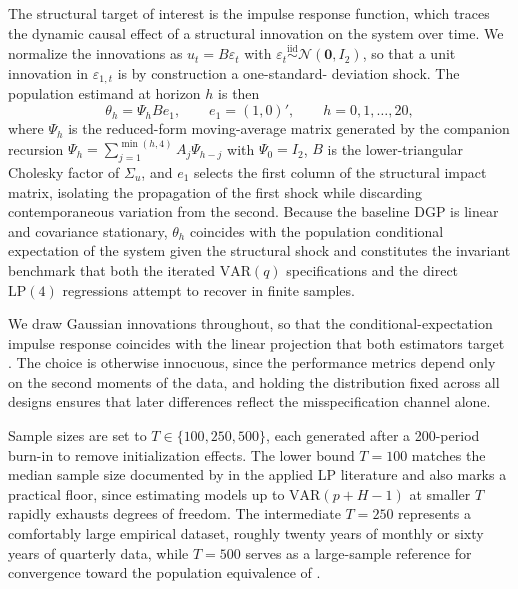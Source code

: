 The structural target of interest is the impulse response function, which traces the dynamic 
causal effect of a structural innovation on the system over time. We normalize the innovations 
as $u_t = B\varepsilon_t$ with $\varepsilon_t \overset{\text{iid}}{\sim} \mathcal{N}(\mathbf{0}, 
I_2)$, so that a unit innovation in $\varepsilon_{1,t}$ is by construction a one-standard-
deviation shock. The population estimand at horizon $h$ is then
%
\begin{equation}
    \theta_h = \Psi_h B e_1, \qquad e_1 = (1, 0)', \qquad h = 0, 1, \ldots, 20,
\end{equation}
%
where $\Psi_h$ is the reduced-form moving-average matrix generated by the companion 
recursion $\Psi_h = \sum_{j=1}^{\min(h,4)} A_j \Psi_{h-j}$ with $\Psi_0 = I_2$, $B$ is the 
lower-triangular Cholesky factor of $\Sigma_u$, and $e_1$ selects the first column of the 
structural impact matrix, isolating the propagation of the first shock while discarding 
contemporaneous variation from the second. Because the baseline DGP is linear and covariance 
stationary, $\theta_h$ coincides with the population conditional expectation of the system 
given the structural shock and constitutes the invariant benchmark that both the iterated 
$\text{VAR}(q)$ specifications and the direct $\text{LP}(4)$ regressions attempt to recover 
in finite samples.

We draw Gaussian innovations throughout, so that the conditional-expectation impulse 
response coincides with the linear projection that both estimators target \parencite{plagborg2021local}. The choice is 
otherwise innocuous, since the performance metrics depend only on the second moments of 
the data, and holding the distribution fixed across all designs ensures that later differences 
reflect the misspecification channel alone.

Sample sizes are set to $T \in \{100, 250, 500\}$, each generated after a 200-period 
burn-in to remove initialization effects. The lower bound $T=100$ matches the median 
sample size documented by \textcite{herbst2024bias} in the applied LP literature and 
also marks a practical floor, since estimating models up to $\text{VAR}(p+H-1)$ at 
smaller $T$ rapidly exhausts degrees of freedom. The intermediate $T=250$ represents 
a comfortably large empirical dataset, roughly twenty years of monthly or sixty years of 
quarterly data, while $T=500$ serves as a large-sample reference for convergence toward the 
population equivalence of \textcite{plagborg2021local}.


